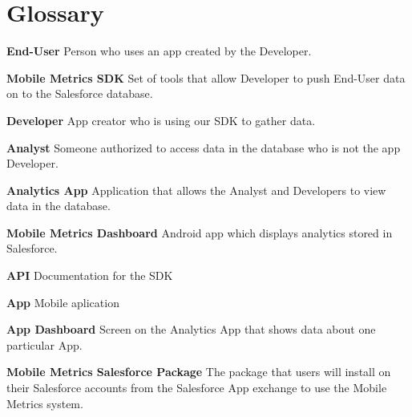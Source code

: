 \documentclass[12pt,oneside,letterpaper]{article}
\begin{document}

\clearpage
\appendix
\section{Glossary}
\begin{flushleft}
\textbf{End-User} Person who uses an app created by the Developer.\newline

\textbf{Mobile Metrics SDK} Set of tools that allow Developer to push End-User data on to the Salesforce database.\newline

\textbf{Developer} App creator who is using our SDK to gather data.\newline

\textbf{Analyst} Someone authorized to access data in the database who is not the app Developer. \newline

\textbf{Analytics App} Application that allows the Analyst and Developers to view data in the database.\newline

\textbf{Mobile Metrics Dashboard} Android app which displays analytics stored in Salesforce. \newline

\textbf{API} Documentation for the SDK \newline

\textbf{App} Mobile aplication\newline

\textbf{App Dashboard} Screen on the Analytics App that shows data about one particular App.\newline

\textbf{Mobile Metrics Salesforce Package} The package that users will install on their Salesforce accounts  from the Salesforce App exchange to use the Mobile Metrics system.
\end{flushleft}
\end{document}

